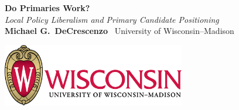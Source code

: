 \documentclass[a0]{a0poster}
\begin{document}


\begin{minipage}[b]{0.6\linewidth}

{\VERYHuge \textsf{\textbf{Do Primaries Work?}}} \\[24pt]
{\veryHuge \emph{Local Policy Liberalism and Primary Candidate Positioning}} \\[24pt]
\Huge \textsf{\textbf{Michael G.\ DeCrescenzo}}
$\,$ \Huge University of Wisconsin--Madison

\end{minipage}
%
%
\begin{minipage}[b]{0.33\linewidth}
\centering \includegraphics[width=0.6\textwidth]{graphics/UWlogo.png}
\vfill
\end{minipage}
\end{document}
